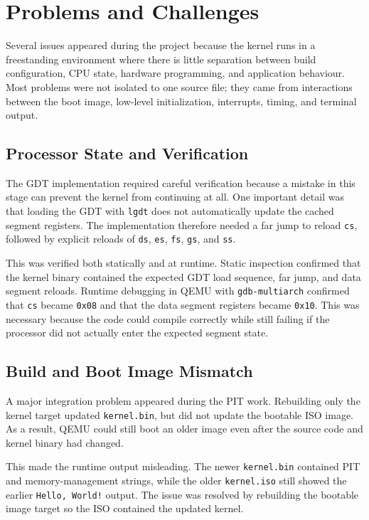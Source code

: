 \section{Problems and Challenges}

Several issues appeared during the project because the kernel runs in a freestanding environment where there is little separation between build configuration, CPU state, hardware programming, and application behaviour. Most problems were not isolated to one source file; they came from interactions between the boot image, low-level initialization, interrupts, timing, and terminal output.

\subsection{Processor State and Verification}
The GDT implementation required careful verification because a mistake in this stage can prevent the kernel from continuing at all. One important detail was that loading the GDT with \texttt{lgdt} does not automatically update the cached segment registers. The implementation therefore needed a far jump to reload \texttt{cs}, followed by explicit reloads of \texttt{ds}, \texttt{es}, \texttt{fs}, \texttt{gs}, and \texttt{ss}.

This was verified both statically and at runtime. Static inspection confirmed that the kernel binary contained the expected GDT load sequence, far jump, and data segment reloads. Runtime debugging in QEMU with \texttt{gdb-multiarch} confirmed that \texttt{cs} became \texttt{0x08} and that the data segment registers became \texttt{0x10}. This was necessary because the code could compile correctly while still failing if the processor did not actually enter the expected segment state.

\subsection{Build and Boot Image Mismatch}
A major integration problem appeared during the PIT work. Rebuilding only the kernel target updated \texttt{kernel.bin}, but did not update the bootable ISO image. As a result, QEMU could still boot an older image even after the source code and kernel binary had changed.

This made the runtime output misleading. The newer \texttt{kernel.bin} contained PIT and memory-management strings, while the older \texttt{kernel.iso} still showed the earlier \texttt{Hello, World!} output. The issue was resolved by rebuilding the bootable image target so the ISO contained the updated kernel.


